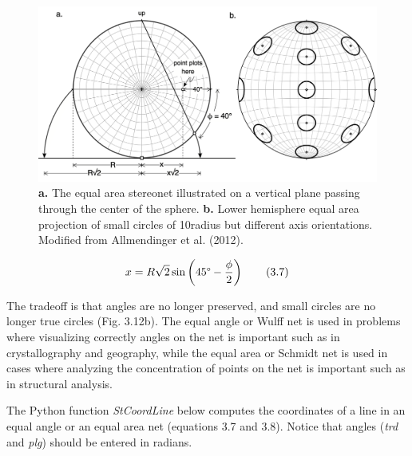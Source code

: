 \documentclass[a4paper , 12pt]{book}
\begin{document}
\begin{figure}[ht]
    \centering
    \includegraphics[width=13cm]{Figures/ch3f12.png}
    \caption{ \textbf{a.} The equal area stereonet illustrated on a vertical plane passing through the center of the sphere. \textbf{b.} Lower hemisphere equal area projection of small circles of 10\degree radius but different axis orientations. Modified from Allmendinger et al. (2012).}
\end{figure}

\begin{equation}
    x = R\sqrt{2}\sin\left(45\degree-\frac{\phi}{2}\right) \tag{3.7}
\end{equation}

The tradeoff is that angles are no longer preserved, and small circles are no longer true circles (Fig. 3.12b). The equal angle or Wulff net is used in problems where visualizing correctly angles on the net is important such as in crystallography and geography, while the equal area or Schmidt net is used in cases where analyzing the concentration of points on the net is important such as in structural analysis.

The Python function \textit{StCoordLine} below computes the coordinates of a line in an equal angle or an equal area net (equations 3.7 and 3.8).  Notice that angles (\textit{trd} and \textit{plg}) should be entered in radians.
\end{document}
